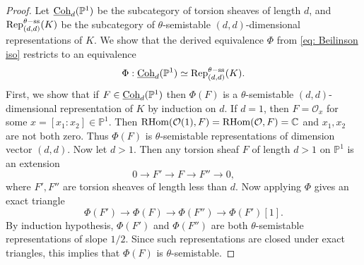 \documentclass[10pt]{amsart}
\newcommand{\BP}{\mathbb{P}}
\newcommand{\CO}{\mathcal{O}}
\newcommand{\PP}{\mathbb{P}} %
\newcommand{\Coh}{\textnormal{Coh}}
\newcommand{\Rep}{\textnormal{Rep}} %
\newcommand{\RHom}{\textnormal{RHom}}
\newcommand{\+}{{}^+}
\theoremstyle{definition}
\theoremstyle {definition}
\theoremstyle {definition}
\begin{document}
\begin{proof}

Let $\underline{\Coh}_d(\BP^1)$ be the subcategory of torsion sheaves of length $d$, and $\Rep^{\theta-\mathrm{ss}}_{(d,d)}(K)$ be the subcategory of $\theta$-semistable $(d,d)$-dimensional representations of $K$. We show that the derived equivalence $\Phi$ from \eqref{eq: Beilinson iso} restricts to an equivalence 
$$\Phi:\underline{\Coh}_d(\BP^1)\simeq \Rep^{\theta-\mathrm{ss}}_{(d,d)}(K). 
$$
First, we show that if $F\in \underline{\Coh}_d(\BP^1)$ then $\Phi(F)$ is a $\theta$-semistable $(d,d)$-dimensional representation of $K$ by induction on $d$. If $d=1$, then $F=\CO_x$ for some $x=[x_1:x_2]\in \BP^1$. Then $\RHom(\CO(1),F) = \RHom(\CO,F)= \mathbb{C}$ and $x_1,x_2$ are not both zero. Thus $\Phi(F)$ is $\theta$-semistable representations of dimension vector $(d,d)$. Now let $d>1$. Then any torsion sheaf $F$ of length $d>1$ on $\PP^1$ is an extension 
$$0\rightarrow F'\rightarrow F\rightarrow F''\rightarrow 0,
$$
where $F', F''$ are torsion sheaves of length less than $d$. Now applying $\Phi$ gives an exact triangle 
\[ \Phi(F') \rightarrow \Phi(F) \rightarrow \Phi(F'') \rightarrow \Phi(F')[1]. \]
By induction hypothesis, $\Phi(F')$ and $\Phi(F'')$ are both $\theta$-semistable representations of slope $1/2$. Since such representations are closed under exact triangles, this implies that $\Phi(F)$ is $\theta$-semistable. 


\end{proof}
\end{document}

